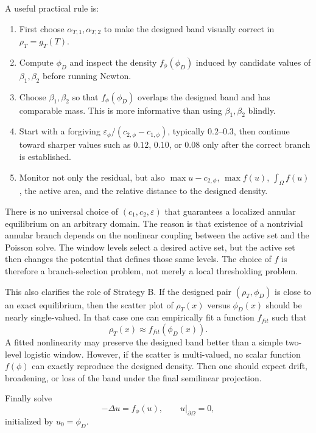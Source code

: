 \documentclass[11pt,a4paper]{article}
\newcommand{\Om}{\Omega}
\newcommand{\eps}{\varepsilon}
\begin{document}
A useful practical rule is:
\begin{enumerate}[leftmargin=2em]
  \item First choose $\alpha_{T,1},\alpha_{T,2}$ to make the designed band
  visually correct in $\rho_T=g_T(T)$.
  \item Compute $\phi_D$ and inspect the density $f_\phi(\phi_D)$ induced by
  candidate values of $\beta_1,\beta_2$ before running Newton.
  \item Choose $\beta_1,\beta_2$ so that $f_\phi(\phi_D)$ overlaps the designed
  band and has comparable mass. This is more informative than using
  $\beta_1,\beta_2$ blindly.
  \item Start with a forgiving $\eps_\phi/(c_{2,\phi}-c_{1,\phi})$, typically
  $0.2$--$0.3$, then continue toward sharper values such as $0.12$, $0.10$,
  or $0.08$ only after the correct branch is established.
  \item Monitor not only the residual, but also $\max u-c_{2,\phi}$,
  $\max f(u)$, $\int_\Om f(u)$, the active area, and the relative distance to
  the designed density.
\end{enumerate}

There is no universal choice of $(c_1,c_2,\eps)$ that guarantees a localized
annular equilibrium on an arbitrary domain. The reason is that existence of a
nontrivial annular branch depends on the nonlinear coupling between the active
set and the Poisson solve. The window levels select a desired active set, but
the active set then changes the potential that defines those same levels. The
choice of $f$ is therefore a branch-selection problem, not merely a local
thresholding problem.

This also clarifies the role of Strategy B. If the designed pair
$(\rho_T,\phi_D)$ is close to an exact equilibrium, then the scatter plot of
$\rho_T(x)$ versus $\phi_D(x)$ should be nearly single-valued. In that case one
can empirically fit a function $f_{fit}$ such that
\begin{equation}
  \rho_T(x)\approx f_{fit}(\phi_D(x)).
\end{equation}
A fitted nonlinearity may preserve the designed band better than a simple
two-level logistic window. However, if the scatter is multi-valued, no scalar
function $f(\phi)$ can exactly reproduce the designed density. Then one should
expect drift, broadening, or loss of the band under the final semilinear
projection.

Finally solve
\begin{equation}
  -\Delta u=f_\phi(u),
  \qquad u|_{\partial\Om}=0,
\end{equation}
initialized by $u_0=\phi_D$.
\end{document}

